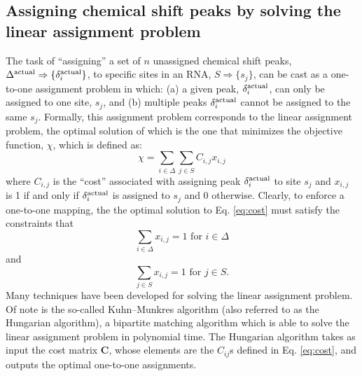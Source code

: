 \documentclass[journal=jcisd8,manuscript=article,layout=onecolumn]{achemso}
\begin{document}
\subsection{Assigning chemical shift peaks by solving the linear assignment problem}
The task of ``assigning'' a set of  $n$ unassigned chemical shift peaks, $\Delta^{\rm actual}\Rightarrow\{\delta_{i}^{\rm actual}\}$, to specific sites in an RNA, $S\Rightarrow\{s_{j}\}$, can be cast as a one-to-one assignment problem in which: (a) a given peak, $\delta_{i}^{\rm actual}$, can only be assigned to one site, $s_{j}$, and  (b) multiple peaks $\delta_{i}^{\rm actual}$ cannot be assigned to the same  $s_{j}$.  Formally, this assignment problem corresponds to the linear assignment problem, the optimal solution of which is the one that minimizes the objective function, $\chi$, which is defined as:
\begin{equation}\label{eq:cost} 
\chi = \sum_{i \in \Delta} \sum_{j \in S} C_{i,j} x_{i,j}
\end{equation}
where $C_{i,j}$ is the ``cost'' associated with assigning peak $\delta_{i}^{\rm actual}$ to site $s_{j}$ and $x_{i,j}$ is 1 if and only if  $\delta_{i}^{\rm actual}$ is assigned to  $s_{j}$ and 0 otherwise. Clearly, to enforce a one-to-one mapping, the the optimal solution to Eq. \ref{eq:cost} must satisfy the constraints that 
\begin{equation}\label{eq:cons1} 
 \sum_{i \in \Delta}  x_{i,j} = 1 \text{ for } i \in \Delta
\end{equation}
and
\begin{equation}\label{eq:cons2} 
 \sum_{j \in S}  x_{i,j} = 1  \text{ for } j \in S.
\end{equation}
Many techniques have been developed for solving the linear assignment problem. Of note is the so-called Kuhn--Munkres algorithm (also referred to as the  Hungarian algorithm), a bipartite matching algorithm which is able to solve the linear assignment problem in polynomial time\cite{kuhn1955hungarian, munkres1957algorithms}. The Hungarian algorithm takes as input the cost matrix \textbf{C}, whose elements are the $C_{ij}$s defined in Eq. \ref{eq:cost}, and outputs the optimal one-to-one assignments.
 
\end{document}
